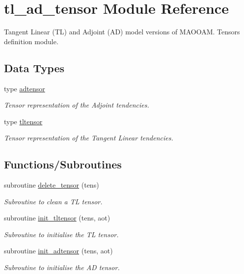 \hypertarget{namespacetl__ad__tensor}{}\section{tl\+\_\+ad\+\_\+tensor Module Reference}
\label{namespacetl__ad__tensor}


Tangent Linear (TL) and Adjoint (AD) model versions of M\+A\+O\+O\+AM. Tensors definition module.  


\subsection*{Data Types}
\begin{DoxyCompactItemize}
\item 
type \hyperlink{structtl__ad__tensor_1_1adtensor}{adtensor}
\begin{DoxyCompactList}\small\item\em Tensor representation of the Adjoint tendencies. \end{DoxyCompactList}\item 
type \hyperlink{structtl__ad__tensor_1_1tltensor}{tltensor}
\begin{DoxyCompactList}\small\item\em Tensor representation of the Tangent Linear tendencies. \end{DoxyCompactList}\end{DoxyCompactItemize}
\subsection*{Functions/\+Subroutines}
\begin{DoxyCompactItemize}
\item 
subroutine \hyperlink{namespacetl__ad__tensor_a32d0c5d5ffa50695665256d151494242}{delete\+\_\+tensor} (tens)
\begin{DoxyCompactList}\small\item\em Subroutine to clean a TL tensor. \end{DoxyCompactList}\item 
subroutine \hyperlink{namespacetl__ad__tensor_a9acec8b42123cf3f8304a5556fa2e295}{init\+\_\+tltensor} (tens, aot)
\begin{DoxyCompactList}\small\item\em Subroutine to initialise the TL tensor. \end{DoxyCompactList}\item 
subroutine \hyperlink{namespacetl__ad__tensor_a3d080c8d8025fb99310e10b5f30398c5}{init\+\_\+adtensor} (tens, aot)
\begin{DoxyCompactList}\small\item\em Subroutine to initialise the AD tensor. \end{DoxyCompactList}\end{DoxyCompactItemize}


